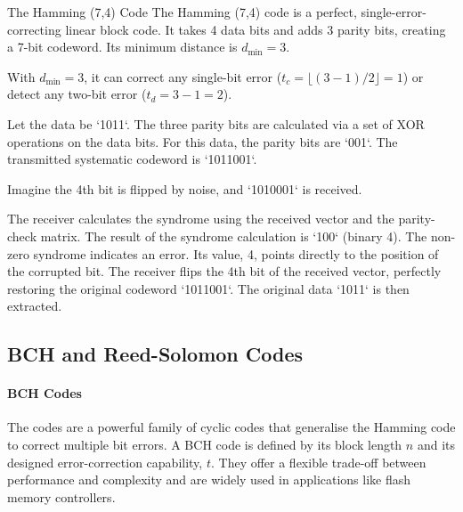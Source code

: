 \begin{workedexample}{The Hamming (7,4) Code}
     The Hamming (7,4) code is a perfect, single-error-correcting linear block code. It takes 4 data bits and adds 3 parity bits, creating a 7-bit codeword. Its minimum distance is $d_{\min}=3$.
    
     With $d_{\min}=3$, it can correct any single-bit error ($t_c = \lfloor(3-1)/2\rfloor = 1$) or detect any two-bit error ($t_d = 3-1 = 2$).

     Let the data be `1011`. The three parity bits are calculated via a set of XOR operations on the data bits. For this data, the parity bits are `001`. The transmitted systematic codeword is `1011001`.
    
     Imagine the 4th bit is flipped by noise, and `1010001` is received.
    \begin{derivationsteps}
        \step The receiver calculates the syndrome using the received vector and the parity-check matrix.
        \step The result of the syndrome calculation is `100` (binary 4).
        \step The non-zero syndrome indicates an error. Its value, 4, points directly to the position of the corrupted bit.
        \step The receiver flips the 4th bit of the received vector, perfectly restoring the original codeword `1011001`. The original data `1011` is then extracted.
    \end{derivationsteps}
\end{workedexample}


\subsection{BCH and Reed-Solomon Codes}

\paragraph{BCH Codes}
The  codes are a powerful family of cyclic codes that generalise the Hamming code to correct multiple bit errors. A BCH code is defined by its block length $n$ and its designed error-correction capability, $t$. They offer a flexible trade-off between performance and complexity and are widely used in applications like flash memory controllers.

